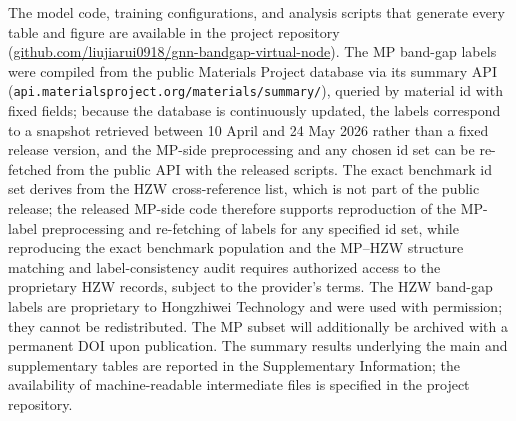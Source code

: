 \documentclass[a4paper,11pt]{article}
\begin{document}
The model code, training configurations, and analysis scripts that generate every table and figure are available in the project repository (\href{https://github.com/liujiarui0918/gnn-bandgap-virtual-node}{github.com/liujiarui0918/gnn-bandgap-virtual-node}). The MP band-gap labels were compiled from the public Materials Project database via its summary API (\texttt{api.materialsproject.org/materials/summary/}), queried by material id with fixed fields; because the database is continuously updated, the labels correspond to a snapshot retrieved between 10 April and 24 May 2026 rather than a fixed release version, and the MP-side preprocessing and any chosen id set can be re-fetched from the public API with the released scripts. The exact benchmark id set derives from the HZW cross-reference list, which is not part of the public release; the released MP-side code therefore supports reproduction of the MP-label preprocessing and re-fetching of labels for any specified id set, while reproducing the exact benchmark population and the MP--HZW structure matching and label-consistency audit requires authorized access to the proprietary HZW records, subject to the provider's terms. The HZW band-gap labels are proprietary to Hongzhiwei Technology and were used with permission; they cannot be redistributed. The MP subset will additionally be archived with a permanent DOI upon publication. The summary results underlying the main and supplementary tables are reported in the Supplementary Information; the availability of machine-readable intermediate files is specified in the project repository.
\end{document}
